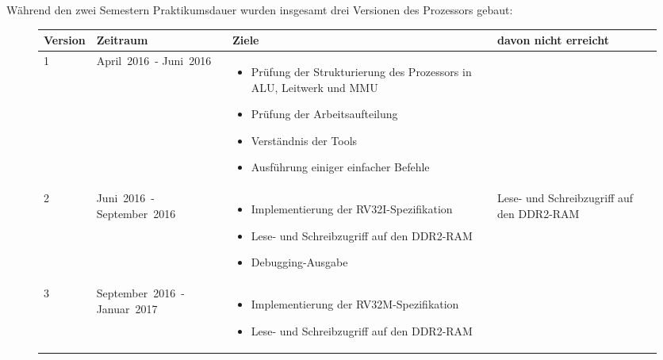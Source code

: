 W\"ahrend den zwei Semestern Praktikumsdauer wurden insgesamt drei Versionen
des Prozessors gebaut:

\begin{figure}[H]
\begin{tabular}{|p{50pt}|p{100pt}|p{180pt}|p{100pt}|}
\hline
Version & Zeitraum                     & Ziele                                                                            & davon nicht erreicht                          \\
\hline
1       & \mbox{April 2016 -} \mbox{Juni 2016}       & \begin{itemize}[noitemsep,topsep=0pt]
                                         \item Pr\"ufung der Strukturierung des Prozessors in ALU, Leitwerk und MMU
                                         \item Pr\"ufung der Arbeitsaufteilung
                                         \item Verst\"andnis der Tools
                                         \item Ausf\"uhrung einiger einfacher Befehle
                                         \end{itemize}                                                                    &                                               \\
\hline
2       & \mbox{Juni 2016 -} \mbox{September 2016}   & \begin{itemize}[noitemsep,topsep=0pt]
                                         \item Implementierung der RV32I-Spezifikation
                                         \item Lese- und Schreibzugriff auf den DDR2-RAM
                                         \item Debugging-Ausgabe
                                         \end{itemize}                                                                    & Lese- und Schreibzugriff auf den DDR2-RAM     \\
\hline
3       & \mbox{September 2016 -} \mbox{Januar 2017} & \begin{itemize}[noitemsep,topsep=0pt]
                                         \item Implementierung der RV32M-Spezifikation
                                         \item Lese- und Schreibzugriff auf den DDR2-RAM

\end{itemize}
\end{tabular}
\end{figure}
